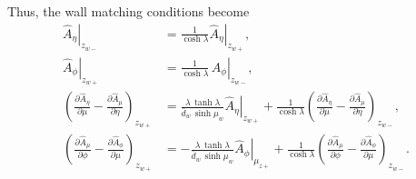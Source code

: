 \documentclass[12pt,prb,aps,notitlepage]{revtex4-1}
\begin{document}
Thus, the wall matching conditions become
\begin{align}
\left.\hat{A}_\eta\right|_{z_{w-}}&= \frac{1}{\cosh\lambda}\left.\hat{A}_\eta\right|_{z_{w+}},\\[0.5ex]
\left.\hat{A}_\phi\right|_{z_{w+}}&= \frac{1}{\cosh\lambda}\,\left.\hat{A}_\phi\right|_{z_{w-}},\\[0.5ex]
\left(\frac{\partial \hat{A}_\eta}{\partial \mu}-\frac{\partial\hat{A}_\mu}{\partial\eta}\right)_{z_{w+}}
&=\frac{\lambda\,\tanh\lambda}{\bar{d}_w\,\sinh\mu_w}\left.\hat{A}_\eta\right|_{z_{w+}} + \frac{1}{\cosh\lambda}\left(\frac{\partial \hat{A}_\eta}{\partial \mu}-\frac{\partial\hat{A}_\mu}{\partial\eta}\right)_{z_{w-}},\\[0.5ex]
\left(\frac{\partial \hat{A}_\mu}{\partial \phi}-\frac{\partial\hat{A}_\phi}{\partial\mu}\right)_{z_{w+}}&= -\frac{\lambda\,\tanh\lambda}{\bar{d}_w\,\sinh\mu_w}\left.\hat{A}_\phi\right|_{\mu_{z+}}+\frac{1}{\cosh\lambda} \left(\frac{\partial \hat{A}_\mu}{\partial \phi}-\frac{\partial\hat{A}_\phi}{\partial\mu}\right)_{z_{w-}}.
\end{align}
\end{document}

